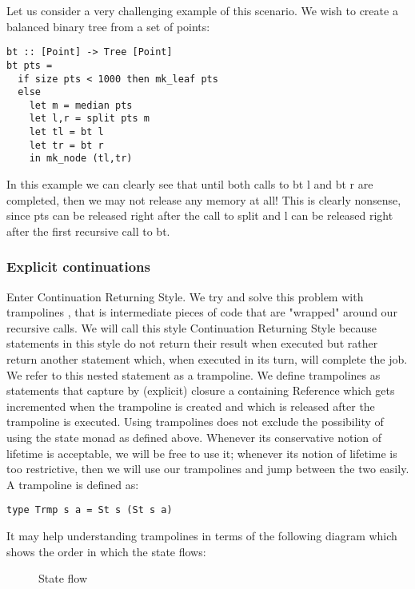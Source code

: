 Let us consider a very challenging example of this scenario. We wish to create a balanced binary tree from a set of points:

\begin{lstlisting}
bt :: [Point] -> Tree [Point]
bt pts =
  if size pts < 1000 then mk_leaf pts
  else
    let m = median pts
    let l,r = split pts m
    let tl = bt l
    let tr = bt r
    in mk_node (tl,tr)
\end{lstlisting}

In this example we can clearly see that until both calls to bt l and bt r are completed, then we may not release any memory at all! This is clearly nonsense, since pts can be released right after the call to split and l can be released right after the first recursive call to bt.


\subsubsection{Explicit continuations}

Enter Continuation Returning Style. We try and solve this problem with trampolines \cite{7_7}, that is intermediate pieces of code that are "wrapped" around our recursive calls. We will call this style Continuation Returning Style because statements in this style do not return their result when executed but rather return another statement which, when executed in its turn, will complete the job. We refer to this nested statement as a trampoline. We define trampolines as statements that capture by (explicit) closure a containing Reference which gets incremented when the trampoline is created and which is released after the trampoline is executed.
Using trampolines does not exclude the possibility of using the state monad as defined above. Whenever its conservative notion of lifetime is acceptable, we will be free to use it; whenever its notion of lifetime is too restrictive, then we will use our trampolines and jump between the two easily. A trampoline is defined as:

\begin{lstlisting}
type Trmp s a = St s (St s a)
\end{lstlisting}

It may help understanding trampolines in terms of the following diagram which shows the order in which the state flows:

\begin{figure}[h]
\centerline{} 
\caption{State flow\label{fig:trampoline_diagram}}
\end{figure}

